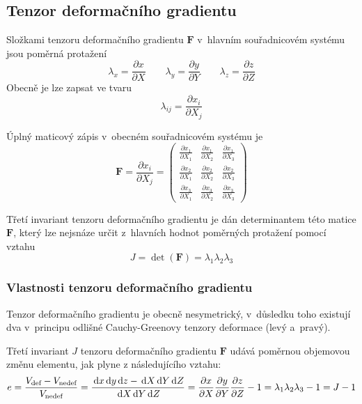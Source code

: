 
\subsection{Tenzor deformačního gradientu}
Složkami tenzoru deformačního gradientu $\bm{F}$ v~hlavním souřadnicovém systému jsou poměrná protažení
\begin{equation}
	\lambda_x  = \frac{\partial x}{\partial X}
	\qquad
	\lambda_y  = \frac{\partial y}{\partial Y}
	\qquad
	\lambda_z  = \frac{\partial z}{\partial Z}
\end{equation}
Obecně je lze zapsat ve tvaru
\begin{equation}
	\lambda_{ij} = \frac{\partial x_i}{\partial X_j}
\end{equation}

Úplný maticový zápis v~obecném souřadnicovém systému je
\begin{equation}
	\bm{F} = \frac{\partial x_i}{\partial X_j} = \left(\begin{matrix}
		\frac{\partial x_1}{\partial X_1} & \frac{\partial x_1}{\partial X_2} & \frac{\partial x_1}{\partial X_3}\\
		\frac{\partial x_2}{\partial X_1} & \frac{\partial x_2}{\partial X_2} & \frac{\partial x_2}{\partial X_3}\\
		\frac{\partial x_3}{\partial X_1} & \frac{\partial x_3}{\partial X_2} & \frac{\partial x_3}{\partial X_3}
	\end{matrix}\right)
\end{equation}

Třetí invariant tenzoru deformačního gradientu je dán determinantem této matice $\bm{F}$, který lze nejsnáze určit z~hlavních hodnot poměrných protažení pomocí vztahu
\begin{equation}
	J = \det(\bm{F}) = \lambda_1 \lambda_2 \lambda_3
\end{equation}

\subsubsection{Vlastnosti tenzoru deformačního gradientu}
Tenzor deformačního gradientu je obecně nesymetrický, v~důsledku toho existují dva v~principu odlišné Cauchy-Greenovy tenzory deformace (levý a~pravý).

Třetí invariant $J$ tenzoru deformačního gradientu $\bm{F}$ udává poměrnou objemovou změnu elementu, jak plyne z následujícího vztahu: 
\begin{equation}
	e
	= \frac{V_\text{def} - V_\text{nedef}}{V_\text{nedef}}
	= \frac{\,\mathrm{d} x \,\mathrm{d} y \,\mathrm{d} z - \,\mathrm{d} X \,\mathrm{d} Y \,\mathrm{d} Z}{\,\mathrm{d} X \,\mathrm{d} Y \,\mathrm{d} Z}
	= \frac{\partial x}{\partial X} \frac{\partial y}{\partial Y} \frac{\partial z}{\partial Z} - 1
	= \lambda_1 \lambda_2 \lambda_3 -1
	= J - 1
\end{equation}

